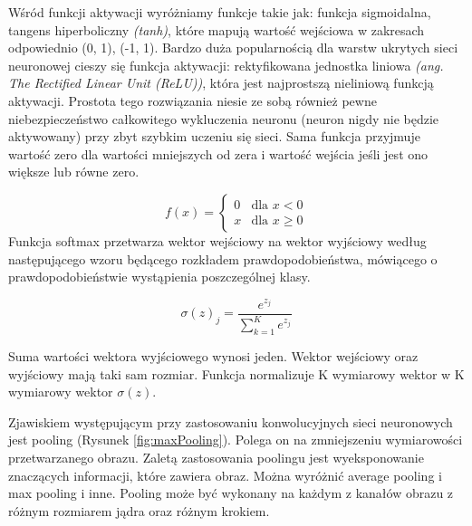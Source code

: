 \documentclass[a4paper,12pt]{article}
\begin{document}
			Wśród funkcji aktywacji wyróżniamy funkcje takie jak: funkcja sigmoidalna,  tangens hiperboliczny \textit{(tanh)}, które mapują wartość wejściowa w zakresach odpowiednio (0, 1), (-1, 1). 
			Bardzo duża popularnością dla warstw ukrytych sieci neuronowej cieszy się funkcja aktywacji: rektyfikowana jednostka liniowa 
			\textit{(ang. The Rectified Linear Unit (ReLU))}, która jest najprostszą nieliniową funkcją aktywacji. Prostota tego rozwiązania niesie ze sobą również pewne niebezpieczeństwo całkowitego wykluczenia neuronu (neuron nigdy nie będzie aktywowany) przy zbyt szybkim uczeniu się sieci.
			Sama funkcja przyjmuje wartość zero dla wartości mniejszych od zera i wartość wejścia jeśli jest ono większe lub równe zero.
			
			\begin{displaymath}
                f(x) =  
                \left\{
                    \begin{array}{ll}
                        0 & \textrm{dla } x < 0 \\
                        x & \textrm{dla } x \geqslant 0
                    \end{array}
                \right.
            \end{displaymath}
			Funkcja softmax przetwarza wektor wejściowy na wektor wyjściowy według następującego wzoru będącego rozkładem prawdopodobieństwa, 
			mówiącego o prawdopodobieństwie wystąpienia poszczególnej klasy. \cite{12}
        \begin{center}
			\begin{displaymath}
				\sigma (z)_{j} = \frac{e^{z_{j}}}{ \sum_{k=1}^K e^{z_{j}}}
			\end{displaymath}
			\end{center}
			Suma wartości wektora wyjściowego wynosi jeden. Wektor wejściowy oraz wyjściowy mają taki sam rozmiar. Funkcja normalizuje K wymiarowy wektor w K wymiarowy wektor  
			$ \sigma (z)$. 
        
	    Zjawiskiem występującym przy zastosowaniu konwolucyjnych sieci neuronowych jest pooling (Rysunek \ref{fig:maxPooling}). Polega on na zmniejszeniu wymiarowości 
			przetwarzanego obrazu. Zaletą zastosowania poolingu jest wyeksponowanie znaczących informacji, które zawiera obraz. Można wyróżnić average 
			pooling i max pooling i inne. Pooling może być wykonany na każdym z kanałów obrazu z różnym rozmiarem jądra oraz różnym krokiem. 
	 
\end{document}
